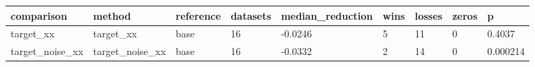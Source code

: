 \begin{tabular}{lllllllll}
\toprule
comparison & method & reference & datasets & median\_reduction & wins & losses & zeros & p \\
\midrule
target\_xx & target\_xx & base & 16 & -0.0246 & 5 & 11 & 0 & 0.4037 \\
target\_noise\_xx & target\_noise\_xx & base & 16 & -0.0332 & 2 & 14 & 0 & 0.000214 \\
\bottomrule
\end{tabular}
